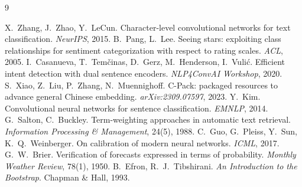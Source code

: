 \begin{thebibliography}{9}
 X.~Zhang, J.~Zhao, Y.~LeCun. Character-level convolutional networks for text classification. \textit{NeurIPS}, 2015.
 B.~Pang, L.~Lee. Seeing stars: exploiting class relationships for sentiment categorization with respect to rating scales. \textit{ACL}, 2005.
 I.~Casanueva, T.~Temčinas, D.~Gerz, M.~Henderson, I.~Vulić. Efficient intent detection with dual sentence encoders. \textit{NLP4ConvAI Workshop}, 2020.
 S.~Xiao, Z.~Liu, P.~Zhang, N.~Muennighoff. C-Pack: packaged resources to advance general Chinese embedding. \textit{arXiv:2309.07597}, 2023.
 Y.~Kim. Convolutional neural networks for sentence classification. \textit{EMNLP}, 2014.
 G.~Salton, C.~Buckley. Term-weighting approaches in automatic text retrieval. \textit{Information Processing \& Management}, 24(5), 1988.
 C.~Guo, G.~Pleiss, Y.~Sun, K.~Q.~Weinberger. On calibration of modern neural networks. \textit{ICML}, 2017.
 G.~W.~Brier. Verification of forecasts expressed in terms of probability. \textit{Monthly Weather Review}, 78(1), 1950.
 B.~Efron, R.~J.~Tibshirani. \textit{An Introduction to the Bootstrap}. Chapman \& Hall, 1993.
\end{thebibliography}
